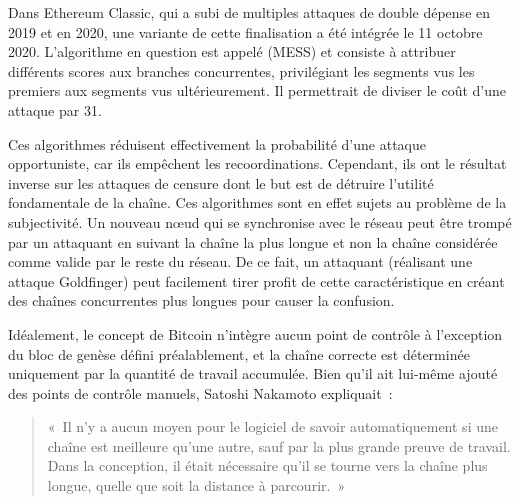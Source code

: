 Dans Ethereum Classic, qui a subi de multiples attaques de double dépense en 2019 et en 2020, une variante de cette finalisation a été intégrée le 11 octobre 2020. L'algorithme en question est appelé  (MESS) et consiste à attribuer différents scores aux branches concurrentes, privilégiant les segments vus les premiers aux segments vus ultérieurement. Il permettrait de diviser le coût d'une attaque par 31.

Ces algorithmes réduisent effectivement la probabilité d'une attaque opportuniste, car ils empêchent les recoordinations. Cependant, ils ont le résultat inverse sur les attaques de censure dont le but est de détruire l'utilité fondamentale de la chaîne. Ces algorithmes sont en effet sujets au problème de la subjectivité. Un nouveau nœud qui se synchronise avec le réseau peut être trompé par un attaquant en suivant la chaîne la plus longue et non la chaîne considérée comme valide par le reste du réseau. De ce fait, un attaquant (réalisant une attaque Goldfinger) peut facilement tirer profit de cette caractéristique en créant des chaînes concurrentes plus longues pour causer la confusion.

Idéalement, le concept de Bitcoin n'intègre aucun point de contrôle à l'exception du bloc de genèse défini préalablement, et la chaîne correcte est déterminée uniquement par la quantité de travail accumulée. Bien qu'il ait lui-même ajouté des points de contrôle manuels, Satoshi Nakamoto expliquait~:

\begin{quote}
«~Il n'y a aucun moyen pour le logiciel de savoir automatiquement si une chaîne est meilleure qu'une autre, sauf par la plus grande preuve de travail. Dans la conception, il était nécessaire qu'il se tourne vers la chaîne plus longue, quelle que soit la distance à parcourir.~»
\end{quote} %

